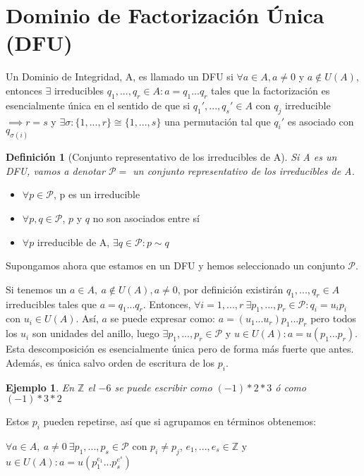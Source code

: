 \documentclass[11pt, a4paper, titlepage]{article}
\providecommand{\ent}{\mathbb{Z}}
\theoremstyle{theorem-style}
\theoremstyle{definition-style}
\newtheorem*{ndef}{Definición}
\theoremstyle{remark-style}
\theoremstyle{example-style}
\newtheorem*{ejemplo}{Ejemplo}
\begin{document}
\section{Dominio de Factorización Única (DFU)}

Un Dominio de Integridad, A, es llamado un DFU si $\forall a \in A, a\ne 0$ y $a\notin U(A)$, entonces $\exists$ irreducibles $q_1 ,...,q_r \in A : a = q_1 ...q_r$ tales que la factorización es esencialmente única en el sentido de que si $q_1' ,...,q_s' \in A $ con $q_j$ irreducible $\implies r = s$ y $\exists \sigma:\{1,...,r\} \cong \{1,...,s\}$ una permutación tal que $q_i'$ es asociado con $q_{\sigma(i)}$

\begin{ndef}[Conjunto representativo de los irreducibles de A]
	Si A es un DFU, vamos a denotar $\mathcal{P}= $ un conjunto representativo de los irreducibles de A.
\end{ndef}

\begin{itemize}
\item $\forall p \in \mathcal{P}$, p es un irreducible
\item $\forall p, q \in \mathcal{P}$, $p$ y $q$ no son asociados entre sí
\item $\forall p $ irreducible de A, $\exists q \in \mathcal{P} : p \sim q$   
\end{itemize}

Supongamos ahora que estamos en un DFU y hemos seleccionado un conjunto $\mathcal{P}$.

Si tenemos un $a\in A,\ a \notin U(A), a \ne 0$, por definición existirán $q_1 ,...,q_r \in A $ irreducibles tales que $a = q_1...q_r $. Entonces, $\forall i = 1,...,r\ \exists p_1,...,p_r \in \mathcal{P} : q_i = u_ip_i $ con $u_i \in U(A)$. Así, $a$ se puede expresar como: $a = (u_1...u_r)p_1...p_r$ pero todos los $u_i$ son unidades del anillo, luego $\exists p_1,...,p_r \in \mathcal{P} $ y $u \in U(A) : a = u(p_1...p_r)$. Esta descomposición es esencialmente única pero de forma más fuerte que antes. Además, es única salvo orden de escritura de los $p_i$.

\begin{ejemplo}
	En $\ent$ el $-6$ se puede escribir como $(-1)*2*3$ ó como $(-1)*3*2$
\end{ejemplo}

Estos $p_i$ pueden repetirse, así que si agrupamos en términos obtenemos:

$\forall a \in A,\ a \ne 0\ \exists p_1,...,p_s \in \mathcal{P}$ con $p_i \ne p_j$, $e_1,...,e_s \in \ent$ y $ u \in U(A) : a = u(p_1^{e_1}...p_s^{e^s})$
\end{document}
